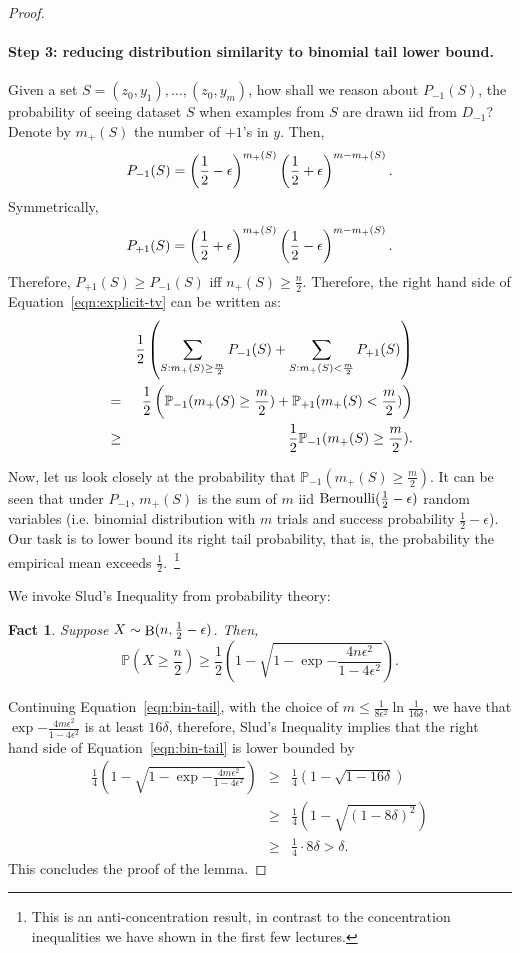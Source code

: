 \documentclass{article}
\newtheorem{fact}{Fact}
\DeclareMathOperator*{\Bin}{{\rm B}}
\newcommand{\PP}{\mathbb{P}}
\DeclareMathOperator*{\Ber}{{\rm Bernoulli}}
\begin{document}
\begin{proof}
\paragraph{Step 3: reducing distribution similarity to binomial tail lower bound.} Given a set $S = (z_0, y_1), \ldots, (z_0, y_m)$, how shall we reason about
$P_{-1}(S)$, the probability of seeing dataset $S$ when examples from $S$ are drawn iid from $D_{-1}$? Denote by $m_+(S)$ the number of
$+1$'s in $y$. Then,
\[ P_{-1}(S) = \del{\frac12 - \epsilon}^{m_+(S)}\del{\frac12 + \epsilon}^{m-m_+(S)}. \]
Symmetrically,
\[ P_{+1}(S) = \del{\frac12 + \epsilon}^{m_+(S)}\del{\frac12 - \epsilon}^{m-m_+(S)}. \]
Therefore, $P_{+1}(S) \geq P_{-1}(S)$ iff $n_+(S) \geq \frac n 2$. Therefore,
the right hand side of Equation~\eqref{eqn:explicit-tv} can be written as:
\begin{eqnarray}
  && \frac12
  \del{\sum_{S: m_+(S) \geq \frac m 2} P_{-1}(S)+\sum_{S: m_+(S) < \frac m 2} P_{+1}(S)} \nonumber \\
  &=& \frac 12 \del{\PP_{-1}(m_+(S) \geq \frac m 2) + \PP_{+1}(m_+(S) < \frac m 2)} \nonumber \\
  &\geq& \frac 12 \PP_{-1}(m_+(S) \geq \frac m 2).
  \label{eqn:bin-tail}
\end{eqnarray}

Now, let us look closely at the probability that
$\PP_{-1}(m_+(S) \geq \frac m 2)$. It can be seen that under $P_{-1}$,
$m_+(S)$ is the sum of $m$ iid $\Ber(\frac12-\epsilon)$ random variables (i.e. binomial distribution with $m$ trials and success probability $\frac12-\epsilon$).
Our task is to lower bound its right tail probability, that is, the probability the empirical mean exceeds $\frac12$.~\footnote{This is an anti-concentration result, in contrast to the concentration inequalities we have shown in the first few lectures.}

We invoke Slud's Inequality from probability theory:
\begin{fact}
Suppose $X \sim \Bin(n,\frac12-\epsilon)$. Then,
\[ \PP(X \geq \frac n 2) \geq \frac12 (1 - \sqrt{1 - \exp{-\frac{4 n \epsilon^2}{1 - 4\epsilon^2}}}). \]
\end{fact}

Continuing Equation~\eqref{eqn:bin-tail}, with the choice of $m \leq \frac{1}{8\epsilon^2} \ln\frac1{16\delta}$, we have that $\exp{-\frac{4 m \epsilon^2}{1 - 4\epsilon^2}}$ is at least $16\delta$, therefore, Slud's Inequality implies that the right hand side of Equation~\eqref{eqn:bin-tail} is lower bounded by
\begin{eqnarray*}
  \frac14 (1 - \sqrt{1 - \exp{-\frac{4 m \epsilon^2}{1 - 4\epsilon^2}}})
  &\geq& \frac14 (1 - \sqrt{1 - 16\delta}) \\
  &\geq& \frac14 (1 - \sqrt{(1 - 8\delta)^2}) \\
  &\geq& \frac 1 4 \cdot 8\delta > \delta.
\end{eqnarray*}
This concludes the proof of the lemma.
\end{proof}
\end{document}
